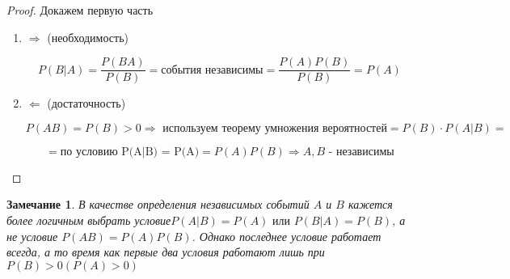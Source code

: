 \documentclass[a4paper, 14pt]{report}
\newtheorem{note}{Замечание}[chapter]
\begin{document}
\begin{proof}
    Докажем первую часть

    \begin{enumerate}
        \item $\Rightarrow$ (необходимость)

            $$
            P(B|A) = \frac{P(BA)}{P(B)} = \text{события независимы} = \frac{P(A)P(B)}{P(B)} = P(A)
            $$

        \item $\Leftarrow$ (достаточность)

            $$
            P(AB) = P(B) > 0 \Rightarrow \text{ используем теорему умножения вероятностей} = P(B) \cdot P(A|B) = 
            $$

            $$
            = \text{по условию P(A|B) = P(A)} = P(A)P(B) \Rightarrow A,B \text{ - независимы}
            $$
    \end{enumerate}
\end{proof}

\begin{note}
    В качестве определения независимых событий $A$ и $B$ кажется более логичным выбрать условие$P(A|B) = P(A) \text{ или } P(B|A) = P(B)$, а не условие  $P(AB) = P(A)P(B)$. Однако последнее условие работает всегда, а то время как первые два условия работают лишь при $P(B) > 0 (P(A) > 0)$
\end{note}
\end{document}
